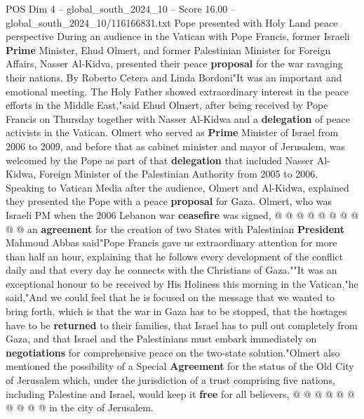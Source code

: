 \begin{textsample}{POS Dim 4 – global\_south\_2024\_10 – Score 16.00 – global\_south\_2024\_10/116166831.txt}  \label{ex:f4_pos_398}
Pope presented with Holy Land peace perspective During an audience in the Vatican with Pope Francis, former Israeli \textbf{Prime} Minister, Ehud Olmert, and former Palestinian Minister for Foreign Affairs, Nasser Al-Kidva, presented their peace \textbf{proposal} for the war ravaging their nations.
By Roberto Cetera and Linda Bordoni"It was an important and emotional meeting.
The Holy Father showed extraordinary interest in the peace efforts in the Middle East,"said Ehud Olmert, after being received by Pope Francis on Thursday together with Nasser Al-Kidwa and a \textbf{delegation} of peace activists in the Vatican.
Olmert who served as \textbf{Prime} Minister of Israel from 2006 to 2009, and before that as cabinet minister and mayor of Jerusalem, was welcomed by the Pope as part of that \textbf{delegation} that included Nasser Al-Kidwa, Foreign Minister of the Palestinian Authority from 2005 to 2006.
Speaking to Vatican Media after the audience, Olmert and Al-Kidwa, explained they presented the Pope with a peace \textbf{proposal} for Gaza.
Olmert, who was Israeli PM when the 2006 Lebanon war \textbf{ceasefire} was signed, @ @ @ @ @ @ @ @ @ @ an \textbf{agreement} for the creation of two States with Palestinian \textbf{President} Mahmoud Abbas said"Pope Francis gave us extraordinary attention for more than half an hour, explaining that he follows every development of the conflict daily and that every day he connects with the Christians of Gaza.""It was an exceptional honour to be received by His Holiness this morning in the Vatican,"he said,"And we could feel that he is focused on the message that we wanted to bring forth, which is that the war in Gaza has to be stopped, that the hostages have to be \textbf{returned} to their families, that Israel has to pull out completely from Gaza, and that Israel and the Palestinians must embark immediately on \textbf{negotiations} for comprehensive peace on the two-state solution."Olmert also mentioned the possibility of a Special \textbf{Agreement} for the status of the Old City of Jerusalem which, under the jurisdiction of a trust comprising five nations, including Palestine and Israel, would keep it \textbf{free} for all believers, @ @ @ @ @ @ @ @ @ @ in the city of Jerusalem.

\end{textsample}
